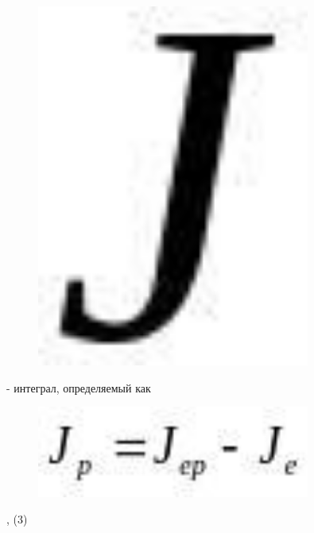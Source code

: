 \begin{figure}[H]
	\centering
	\includegraphics[width=0.8\textwidth]{assets/1162}
	\caption*{}
\end{figure}- интеграл, определяемый как

\begin{figure}[H]
	\centering
	\includegraphics[width=0.8\textwidth]{assets/1163}
	\caption*{}
\end{figure}, (3)


